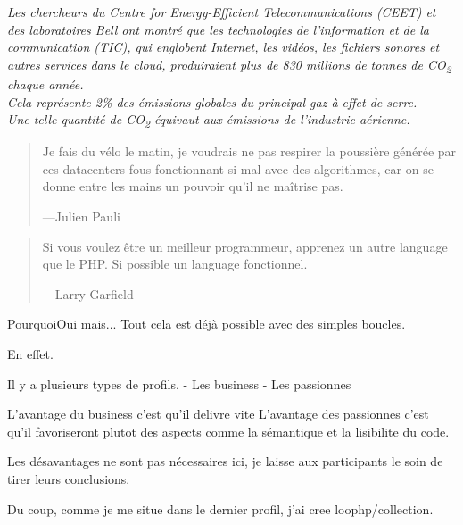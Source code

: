\begin{frame}
    \begin{center}
        \textit{
            Les chercheurs du Centre for Energy-Efficient Telecommunications (CEET) et des laboratoires Bell ont montré que
            les technologies de l'information et de la communication (TIC), qui englobent Internet, les vidéos, les fichiers sonores
            et autres services dans le cloud, produiraient plus de 830 millions de tonnes de CO\textsubscript{2} chaque année.\\
            Cela représente 2\% des émissions globales du principal gaz à effet de serre.\\
            Une telle quantité de CO\textsubscript{2} équivaut aux émissions de l'industrie aérienne.
        }
    \end{center}

\end{frame}

\begin{frame}
    \begin{quote}
        Je fais du vélo le matin, je voudrais ne pas respirer la poussière générée
        par ces datacenters fous fonctionnant si mal avec des algorithmes,
        car on se donne entre les mains un pouvoir qu'il ne maîtrise pas.

        \begin{flushright}
            \tiny{---Julien Pauli}
        \end{flushright}
    \end{quote}
\end{frame}

\begin{frame}
    \begin{quote}
        Si vous voulez être un meilleur programmeur, apprenez un autre language que
        le PHP. Si possible un language fonctionnel.

        \begin{flushright}
            \tiny{---Larry Garfield}
        \end{flushright}
    \end{quote}
\end{frame}


\begin{frame}{Pourquoi}{Oui mais...}
    Tout cela est déjà possible avec des simples boucles.

    En effet.

    Il y a plusieurs types de profils.
    - Les business
    - Les passionnes

    L'avantage du business c'est qu'il delivre vite
    L'avantage des passionnes c'est qu'il favoriseront plutot
    des aspects comme la sémantique et la lisibilite du code.

    Les désavantages ne sont pas nécessaires ici, je laisse aux
    participants le soin de tirer leurs conclusions.

    Du coup, comme je me situe dans le dernier profil, j'ai cree
    loophp/collection.
\end{frame}


